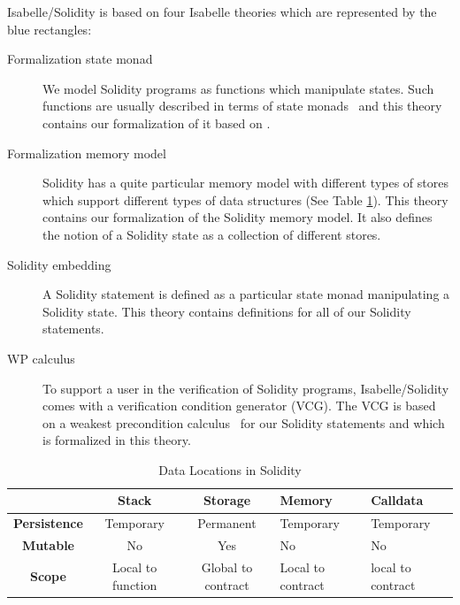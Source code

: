 \documentclass[a4paper,UKenglish,cleveref, autoref, thm-restate]{oasics-v2021}
\begin{document}
Isabelle/Solidity is based on four Isabelle theories which are represented by the {\color{blue}blue rectangles}:
\begin{description}
    \item[Formalization state monad]
    We model Solidity programs as functions which manipulate states.
    Such functions are usually described in terms of state monads~\cite{Wadler1993} and this theory contains our formalization of it based on \cite{Cock2008}.
    \item[Formalization memory model]
    Solidity has a quite particular memory model with different types of stores which support different types of data structures (See Table \ref{tab:stores}).
    This theory contains our formalization of the Solidity memory model.
    It also defines the notion of a Solidity state as a collection of different stores.
    \item[Solidity embedding]
    A Solidity statement is defined as a particular state monad manipulating a Solidity state.
    This theory contains definitions for all of our Solidity statements.
    \item[WP calculus]
    To support a user in the verification of Solidity programs, Isabelle/Solidity comes with a verification condition generator (VCG).
    The VCG is based on a weakest precondition calculus~\cite{Dijkstra1975} for our Solidity statements and which is formalized in this theory.
\end{description}
\begin{table}[b]\footnotesize
	\centering
	\vspace{-.5cm}
	\caption{Data Locations in Solidity}\label{tab:stores}
	\small\vspace{-0.2cm}\begin{tabular}{cccm{2.85cm}m{2.85cm}}
		\toprule
		&\textbf{Stack}&\textbf{Storage}&\textbf{Memory}&\textbf{Calldata}\\
		\midrule
		\textbf{Persistence}&Temporary&Permanent&Temporary&Temporary\\
		\textbf{Mutable}&No&Yes&No&No\\
		\textbf{Scope}&Local to function&Global to contract&Local to contract& local to contract\\
			\bottomrule
	\end{tabular}
	\vspace{-0.5cm}
\end{table}
\end{document}

